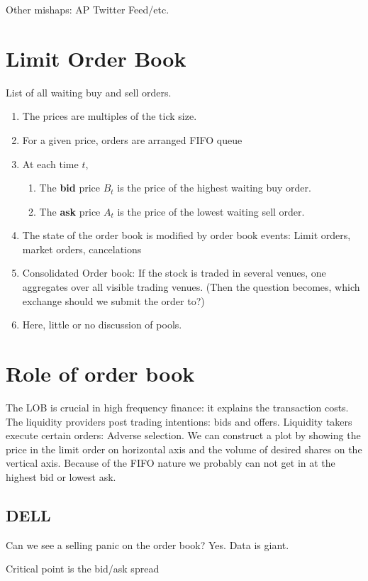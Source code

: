 Other mishaps: AP Twitter Feed/etc.

\section{Limit Order Book}
List of all waiting buy and sell orders.
\begin{enumerate}
	\item The prices are multiples of the tick size.
	\item For a given price, orders are arranged FIFO queue
	\item At each time $t$,
	\begin{enumerate}
		\item The {\bf bid} price $B_t$ is the price of the highest waiting buy order.
		\item The {\bf ask} price $A_t$ is the price of the lowest waiting sell order.
	\end{enumerate}
	\item The state of the order book is modified by order book events: Limit orders, market orders, cancelations
	\item Consolidated Order book: If the stock is traded in several venues, one aggregates over all visible trading venues. (Then the question becomes, which exchange should we submit the order to?)
	\item Here, little or no discussion of pools.
\end{enumerate}

\section{Role of order book}
The LOB is crucial in high frequency finance: it explains the transaction costs. 
The liquidity providers post trading intentions: bids and offers. 
Liquidity takers execute certain orders: Adverse selection. 
We can construct a plot by showing the price in the limit order on horizontal axis and the volume of desired shares on the vertical axis.
Because of the FIFO nature we probably can not get in at the highest bid or lowest ask.

\subsection{DELL}
Can we see a selling panic on the order book? Yes. Data is giant. 

Critical point is the bid/ask spread
